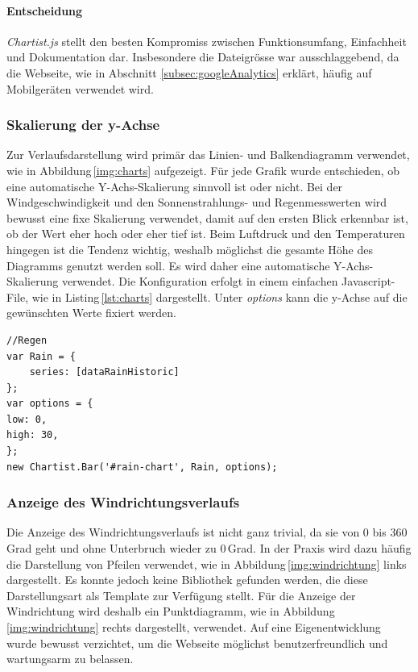 \paragraph*{Entscheidung}
\emph{Chartist.js} stellt den besten Kompromiss zwischen Funktionsumfang, Einfachheit und Dokumentation dar. Insbesondere die Dateigrösse war ausschlaggebend, da die Webseite, wie in Abschnitt \ref{subsec:googleAnalytics} erklärt, häufig auf Mobilgeräten verwendet wird.


\subsubsection{Skalierung der y-Achse}
Zur Verlaufsdarstellung wird primär das Linien- und Balkendiagramm verwendet, wie in Abbildung\,\ref{img:charts} aufgezeigt. Für jede Grafik wurde entschieden, ob eine automatische Y-Achs-Skalierung sinnvoll ist oder nicht. Bei der Windgeschwindigkeit und den Sonnenstrahlungs- und Regenmesswerten wird bewusst eine fixe Skalierung verwendet, damit auf den ersten Blick erkennbar ist, ob der Wert eher hoch oder eher tief ist. Beim Luftdruck und den Temperaturen hingegen ist die Tendenz wichtig, weshalb möglichst die gesamte Höhe des Diagramms genutzt werden soll. Es wird daher eine automatische Y-Achs-Skalierung verwendet. Die Konfiguration erfolgt in einem einfachen Javascript-File, wie in Listing\,\ref{lst:charts}  dargestellt. Unter \emph{options} kann die y-Achse auf die gewünschten Werte fixiert werden.

\begin{lstlisting}[label=lst:charts,caption=Konfiguration eines Verlaufsdiagramms, language=HTML5, style=htmlcssjs]
//Regen
var Rain = {
	series: [dataRainHistoric]
};
var options = {
low: 0,
high: 30,
};
new Chartist.Bar('#rain-chart', Rain, options);
\end{lstlisting}

\subsubsection{Anzeige des Windrichtungsverlaufs}
Die Anzeige des Windrichtungsverlaufs ist nicht ganz trivial, da sie von 0 bis 360\,Grad geht und ohne Unterbruch wieder zu 0\,Grad. In der Praxis wird dazu häufig die Darstellung von Pfeilen verwendet, wie in Abbildung\,\ref{img:windrichtung} links dargestellt. Es konnte jedoch keine Bibliothek gefunden werden, die diese Darstellungsart als Template zur Verfügung stellt. Für die Anzeige der Windrichtung wird deshalb ein Punktdiagramm, wie in Abbildung\,\ref{img:windrichtung} rechts dargestellt, verwendet. Auf eine Eigenentwicklung wurde bewusst verzichtet, um die Webseite möglichst benutzerfreundlich und wartungsarm zu belassen.

